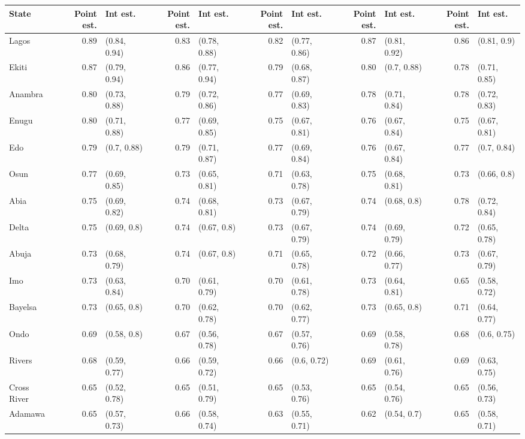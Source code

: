 
\begin{tabular}{lrlrlrlrlrl}
\toprule
State & Point est. & Int est. & Point est. & Int est. & Point est. & Int est. & Point est. & Int est. & Point est. & Int est.\\
\midrule
Lagos & 0.89 & (0.84, 0.94) & 0.83 & (0.78, 0.88) & 0.82 & (0.77, 0.86) & 0.87 & (0.81, 0.92) & 0.86 & (0.81, 0.9)\\
Ekiti & 0.87 & (0.79, 0.94) & 0.86 & (0.77, 0.94) & 0.79 & (0.68, 0.87) & 0.80 & (0.7, 0.88) & 0.78 & (0.71, 0.85)\\
Anambra & 0.80 & (0.73, 0.88) & 0.79 & (0.72, 0.86) & 0.77 & (0.69, 0.83) & 0.78 & (0.71, 0.84) & 0.78 & (0.72, 0.83)\\
Enugu & 0.80 & (0.71, 0.88) & 0.77 & (0.69, 0.85) & 0.75 & (0.67, 0.81) & 0.76 & (0.67, 0.84) & 0.75 & (0.67, 0.81)\\
Edo & 0.79 & (0.7, 0.88) & 0.79 & (0.71, 0.87) & 0.77 & (0.69, 0.84) & 0.76 & (0.67, 0.84) & 0.77 & (0.7, 0.84)\\
Osun & 0.77 & (0.69, 0.85) & 0.73 & (0.65, 0.81) & 0.71 & (0.63, 0.78) & 0.75 & (0.68, 0.81) & 0.73 & (0.66, 0.8)\\
Abia & 0.75 & (0.69, 0.82) & 0.74 & (0.68, 0.81) & 0.73 & (0.67, 0.79) & 0.74 & (0.68, 0.8) & 0.78 & (0.72, 0.84)\\
Delta & 0.75 & (0.69, 0.8) & 0.74 & (0.67, 0.8) & 0.73 & (0.67, 0.79) & 0.74 & (0.69, 0.79) & 0.72 & (0.65, 0.78)\\
Abuja & 0.73 & (0.68, 0.79) & 0.74 & (0.67, 0.8) & 0.71 & (0.65, 0.78) & 0.72 & (0.66, 0.77) & 0.73 & (0.67, 0.79)\\
Imo & 0.73 & (0.63, 0.84) & 0.70 & (0.61, 0.79) & 0.70 & (0.61, 0.78) & 0.73 & (0.64, 0.81) & 0.65 & (0.58, 0.72)\\
Bayelsa & 0.73 & (0.65, 0.8) & 0.70 & (0.62, 0.78) & 0.70 & (0.62, 0.77) & 0.73 & (0.65, 0.8) & 0.71 & (0.64, 0.77)\\
Ondo & 0.69 & (0.58, 0.8) & 0.67 & (0.56, 0.78) & 0.67 & (0.57, 0.76) & 0.69 & (0.58, 0.78) & 0.68 & (0.6, 0.75)\\
Rivers & 0.68 & (0.59, 0.77) & 0.66 & (0.59, 0.72) & 0.66 & (0.6, 0.72) & 0.69 & (0.61, 0.76) & 0.69 & (0.63, 0.75)\\
Cross River & 0.65 & (0.52, 0.78) & 0.65 & (0.51, 0.79) & 0.65 & (0.53, 0.76) & 0.65 & (0.54, 0.76) & 0.65 & (0.56, 0.73)\\
Adamawa & 0.65 & (0.57, 0.73) & 0.66 & (0.58, 0.74) & 0.63 & (0.55, 0.71) & 0.62 & (0.54, 0.7) & 0.65 & (0.58, 0.71)\\

\end{tabular}
